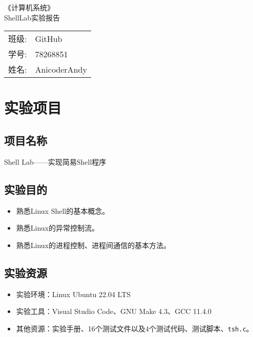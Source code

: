 \documentclass[a4paper, 11pt]{ctexart}
\let\oldsection\section
\renewcommand{\section}{\clearpage\oldsection}
\begin{document}
\sloppy
\begin{titlepage}
    \begin{center}
        \vspace*{5cm}
        \yahei{}《计算机系统》\\ \vspace{50pt}ShellLab实验报告
        \vfill
        \begin{tabular}{ll}
            班级: & GitHub\\
            学号: & 78268851\\
            姓名: & AnicoderAndy\\
        \end{tabular}
    \end{center}
\end{titlepage}
\setcounter{page}{2}

\renewcommand{\contentsname}{\centering 目录}
\tableofcontents

\section{实验项目}
\setcounter{subsection}{0}
\subsection{项目名称}
Shell Lab——实现简易Shell程序

\subsection{实验目的}
\begin{itemize}
    \item 熟悉Linux Shell的基本概念。
    \item 熟悉Linux的异常控制流。
    \item 熟悉Linux的进程控制、进程间通信的基本方法。
\end{itemize}

\subsection{实验资源}
\begin{itemize}
    \item 实验环境：Linux Ubuntu 22.04 LTS
    \item 实验工具：Visual Studio Code、GNU Make 4.3、GCC 11.4.0
    \item 其他资源：实验手册、16个测试文件以及4个测试代码、测试脚本、\texttt{tsh.c}。
\end{itemize}
\end{document}
